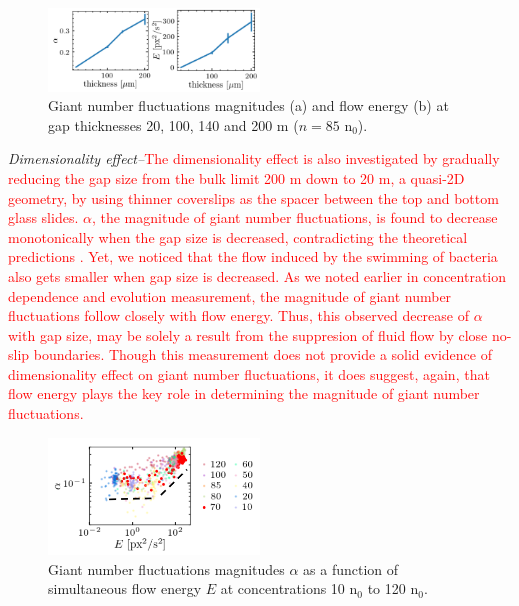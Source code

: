 \documentclass[twocolumn,aps,prl,amsmath,amssymb,longbibliography]{revtex4-1}
\begin{document}
\begin{figure}[!]
\begin{center}
\includegraphics[width=0.5\textwidth]{figures/fig-6-v1.png}
\caption[]{Giant number fluctuations magnitudes (a) and flow energy (b) at gap thicknesses 20, 100, 140 and 200 \textmu m ($n=85$ n$_0$).}
\label{fig:6}
\end{center}
\end{figure}

\textit{Dimensionality effect--}\textcolor{red}{The dimensionality effect is also investigated by gradually reducing the gap size from the bulk limit 200 \textmu m down to 20 \textmu m, a quasi-2D geometry, by using thinner coverslips as the spacer between the top and bottom glass slides. $\alpha$, the magnitude of giant number fluctuations, is found to decrease monotonically when the gap size is decreased, contradicting the theoretical predictions \cite{PhysRevLett.89.058101}. Yet, we noticed that the flow induced by the swimming of bacteria also gets smaller when gap size is decreased. As we noted earlier in concentration dependence and evolution measurement, the magnitude of giant number fluctuations follow closely with flow energy. Thus, this observed decrease of $\alpha$ with gap size, may be solely a result from the suppresion of fluid flow by close no-slip boundaries. Though this measurement does not provide a solid evidence of dimensionality effect on giant number fluctuations, it does suggest, again, that flow energy plays the key role in determining the magnitude of giant number fluctuations.}

\begin{figure}[!]
\begin{center}
\includegraphics[width=0.5\textwidth]{figures/fig-7-v1.png}
\caption[]{Giant number fluctuations magnitudes $\alpha$ as a function of simultaneous flow energy $E$ at concentrations 10 n$_0$ to 120 n$_0$.}
\label{fig:7}
\end{center}
\end{figure}
\end{document}
